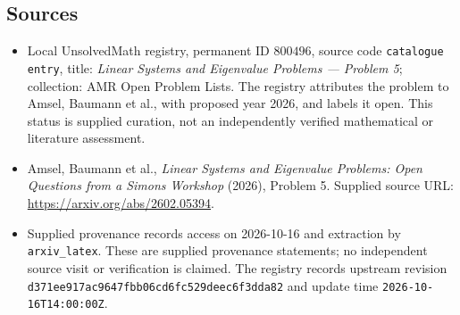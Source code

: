 \documentclass[11pt]{article}
\begin{document}
\subsection{Sources}
\begin{itemize}
\item Local UnsolvedMath registry, permanent ID \(800496\), source code \texttt{catalogue entry}, title: \emph{Linear Systems and Eigenvalue Problems --- Problem 5}; collection: AMR Open Problem Lists. The registry attributes the problem to Amsel, Baumann et al., with proposed year 2026, and labels it open. This status is supplied curation, not an independently verified mathematical or literature assessment.
\item Amsel, Baumann et al., \emph{Linear Systems and Eigenvalue Problems: Open Questions from a Simons Workshop} (2026), Problem 5. Supplied source URL: \url{https://arxiv.org/abs/2602.05394}.
\item Supplied provenance records access on 2026-10-16 and extraction by \texttt{arxiv\_latex}. These are supplied provenance statements; no independent source visit or verification is claimed. The registry records upstream revision \texttt{d371ee917ac9647fbb06cd6fc529deec6f3dda82} and update time \texttt{2026-10-16T14:00:00Z}.
\end{itemize}
\end{document}
